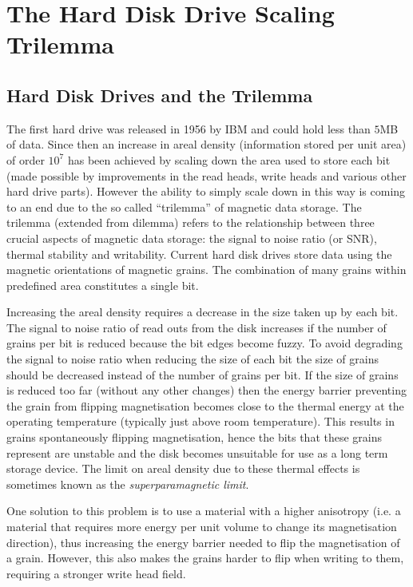 \chapter{The Hard Disk Drive Scaling Trilemma}
\label{sec:trilemma}

\section{Hard Disk Drives and the Trilemma}
\label{sec:hard-disk-drives}

The first hard drive was released in 1956 by IBM and could hold less than $5$MB of data. Since then an increase in areal density (information stored per unit area) of order $10^{7}$ has been achieved by scaling down the area used to store each bit (made possible by improvements in the read heads, write heads and various other hard drive parts)\cite{Stefanita2008}. However the ability to simply scale down in this way is coming to an end due to the so called ``trilemma'' of magnetic data storage\cite{Chan2010}. The trilemma (extended from dilemma) refers to the relationship between three crucial aspects of magnetic data storage: the signal to noise ratio (or SNR), thermal stability and writability. Current hard disk drives store data using the magnetic orientations of magnetic grains. The combination of many grains within predefined area constitutes a single bit.

Increasing the areal density requires a decrease in the size taken up by each bit. The signal to noise ratio of read outs from the disk increases if the number of grains per bit is reduced because the bit edges become fuzzy. To avoid degrading the signal to noise ratio when reducing the size of each bit the size of grains should be decreased instead of the number of grains per bit.\cite{McDaniel2005} If the size of grains is reduced too far (without any other changes) then the energy barrier preventing the grain from flipping magnetisation becomes close to the thermal energy at the operating temperature (typically just above room temperature). This results in grains spontaneously flipping magnetisation, hence the bits that these grains represent are unstable and the disk becomes unsuitable for use as a long term storage device. The limit on areal density due to these thermal effects is sometimes known as the \emph{superparamagnetic limit}.

One solution to this problem is to use a material with a higher anisotropy (i.e. a material that requires more energy per unit volume to change its magnetisation direction), thus increasing the energy barrier needed to flip the magnetisation of a grain. However, this also makes the grains harder to flip when writing to them, requiring a stronger write head field.

